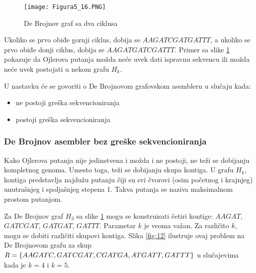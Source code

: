 \documentclass[12pt,oneside]{memoir}
\begin{document}
\begin{figure}[!ht]
\centering
\texttt{[image: Figura5\_16.PNG]}
\caption{De Brojnov graf sa dva ciklusa \cite{WingKinSung}}
\label{fig:10}
\end{figure}

\noindent Ukoliko se prvo obiđe gornji ciklus, dobija se $AAGATCGATGATTT$, a ukoliko se prvo obiđe donji ciklus, dobija se $AAGATGATCGATTT$. Primer sa slike \ref{fig:10} pokazuje da Ojlerova putanja možda neće uvek dati ispravnu sekvencu ili možda neće uvek postojati u nekom grafu $H_k$.

U nastavku će se govoriti o De Brojnovom grafovskom asembleru u slučaju kada:
\begin{itemize}
\itemsep0em 
    \item{ne postoji greška sekvencioniranja}
    \item{postoji greška sekvencioniranja}
\end{itemize}

\subsubsection{De Brojnov asembler bez greške sekvencioniranja}

Kako Ojlerova putanja nije jedinstvena i možda i ne postoji, ne teži se dobijanju kompletnog genoma. Umesto toga, teži se dobijanju skupa kontiga. U grafu $H_k$, kontiga predstavlja najdužu putanju čiji su svi čvorovi (osim početnog i krajnjeg) unutrašnjeg i spoljašnjeg stepena 1. Takva putanja se naziva maksimalnom prostom putanjom. 

\begin{comment}
Slika \ref{fig:11} daje pseudokod ovog jednostavnog metoda.


\begin{figure}[!ht]
\centering
\texttt{[image: Figura5\_17.PNG]}
\caption{Jednstavan De Brojnov grafovski asmbler \cite{WingKinSung}}
\label{fig:11}
\end{figure}

\end{comment}

Za De Brojnov graf $H_3$ sa slike \ref{fig:10} mogu se konstruisati četiri kontige: $AAGAT$, $GATCGAT$, $GATGAT$, $GATTT$. Parametar $k$ je veoma važan. Za različito $k$, mogu se dobiti različiti skupovi kontiga. Slika \ref{fig:12} ilustruje ovaj problem na De Brojnovom grafu za skup $R = \{AAGATC, GATCGAT, CGATGA, ATGATT,\\ GATTT\}$ u slučajevima kada je $k = 4$ i $k = 5$.
\end{document}

